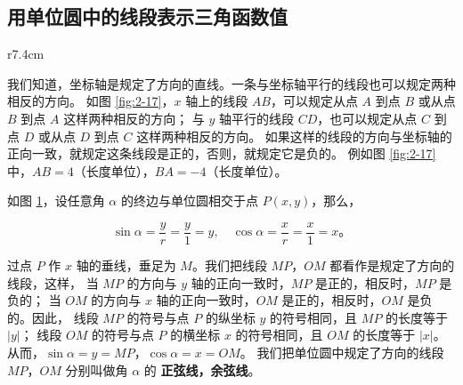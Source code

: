 \subsection{用单位圆中的线段表示三角函数值}\label{subsec:2-7}

\begin{wrapfigure}[17]{r}{7.4cm}
    \centering
    
    \caption{}\label{fig:2-17}
\end{wrapfigure}

我们知道，坐标轴是规定了方向的直线。一条与坐标轴平行的线段也可以规定两种相反的方向。
如图 \ref{fig:2-17}，$x$ 轴上的线段 $AB$，可以规定从点 $A$ 到点 $B$ 或从点 $B$ 到点 $A$ 这样两种相反的方向；
与 $y$ 轴平行的线段 $CD$，也可以规定从点 $C$ 到点 $D$ 或从点 $D$ 到点 $C$ 这样两种相反的方向。
如果这样的线段的方向与坐标轴的正向一致，就规定这条线段是正的，否则，就规定它是负的。
例如图 \ref{fig:2-17} 中，$AB = 4$（长度单位），$BA = -4$（长度单位）。

如图 \ref{fig:2-18}，设任意角 $\alpha$ 的终边与单位圆相交于点 $P(x, y)$，那么，

$$\sin\alpha = \dfrac y r = \dfrac y 1 = y, \quad \cos\alpha = \dfrac x r = \dfrac x 1 = x \text{。}$$
\vspace{0.5em}

过点 $P$ 作 $x$ 轴的垂线，垂足为 $M$。我们把线段 $MP$，$OM$ 都看作是规定了方向的线段，这样，
当 $MP$ 的方向与 $y$ 轴的正向一致时，$MP$ 是正的，相反时，$MP$ 是负的；
当 $OM$ 的方向与 $x$ 轴的正向一致时，$OM$ 是正的，相反时，$OM$ 是负的。因此，
线段 $MP$ 的符号与点 $P$ 的纵坐标 $y$ 的符号相同，且 $MP$ 的长度等于 $|y|$；
线段 $OM$ 的符号与点 $P$ 的横坐标 $x$ 的符号相同，且 $OM$ 的长度等于 $|x|$。
从而，$\sin\alpha = y = MP$，$\cos\alpha = x = OM$。
我们把单位圆中规定了方向的线段 $MP$，$OM$ 分别叫做角 $\alpha$ 的 \textbf{正弦线，余弦线}。

\begin{figure}[H]
    \centering
    \begin{minipage}{8cm}
    \centering
    
    \end{minipage}
    \qquad
    \begin{minipage}{8cm}
    \centering
    
    \end{minipage}
    \begin{minipage}{8cm}
    \centering
    
    \end{minipage}
    \qquad
    \begin{minipage}{8cm}
    \centering
    
    \end{minipage}
    \caption{}\label{fig:2-18}
\end{figure}


